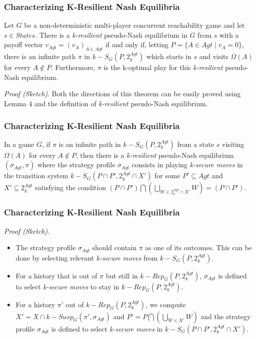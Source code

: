 \documentclass{beamer}
\begin{document}
\begin{frame}
\frametitle{Characterizing K-Resilient Nash Equilibria}
\begin{theorem}[5]
Let $G$ be a non-deterministic multi-player concurrent reachability game and let $s \in States$. There is a \textit{k-resilient} pseudo-Nash equilibrium in $G$ from $s$ with a payoff vector $v_{Agt} = (v_{A})_{A\in Agt}$ if and only if, letting $P = \lbrace A \in Agt \; \vert \; v_{A} = 0 \rbrace$, there is an infinite path $\pi$ in $k-S_{G}(P, 2^{Agt}_{k})$ which starts in $s$ and visits $\Omega(A)$ for every $A \notin P$. Furthermore, $\pi$ is the k-optimal play for this \textit{k-resilient} pseudo-Nash equilibrium.
\end{theorem}
\textit{Proof (Sketch)}. Both the directions of this theorem can be easily proved using Lemma 4 and the definition of \textit{k-resilient} pseudo-Nash equilibrium.
\end{frame}

\begin{frame}
\frametitle{Characterizing K-Resilient Nash Equilibria}
\begin{theorem}[6]
In a game $G$, if $\pi$ is an infinite path in $k-S_{G}(P, 2^{Agt}_{k})$ from a state $s$ visiting $\Omega(A)$ for every $A \notin P$, then there is a \textit{k-resilient} pseudo-Nash equilibrium $(\sigma_{Agt}, \pi)$ where the strategy profile $\sigma_{Agt}$ consists in playing \textit{k-secure moves} in the transition system $k-S_{G}(P \cap P', 2^{Agt}_{k} \cap X')$ for some $P' \subseteq Agt$ and $X' \subseteq 2^{Agt}_{k}$ satisfying the condition $(P \cap P') \bigcap \left( \bigcup \limits_{W \in 2^{Agt}_{k} \cap X'}W \right) = (P \cap P')$.
\end{theorem}
\end{frame}

\begin{frame}
\frametitle{Characterizing K-Resilient Nash Equilibria}
\textit{Proof (Sketch).}
\begin{itemize}
\item The strategy profile $\sigma_{Agt}$ should contain $\pi$ as one of its outcomes. This can be done by selecting relevant \textit{k-secure moves} from $k-S_{G}(P, 2^{Agt}_{k})$.
\item For a history that is out of $\pi$ but still in $k-Rep_{G}(P, 2^{Agt}_{k})$, $\sigma_{Agt}$ is defined to select \textit{k-secure moves} to stay in $k-Rep_{G}(P, 2^{Agt}_{k})$.
\item For a history $\pi'$ out of $k-Rep_{G}(P, 2^{Agt}_{k})$, we compute $X' = X \cap k-Susp_{G}(\pi', \sigma_{Agt})$ and $P' = P \bigcap \left( \bigcup \limits_{W \in X'}W \right)$ and the strategy profile $\sigma_{Agt}$ is defined to select \textit{k-secure moves} in $k-S_{G}(P \cap P', 2^{Agt}_{k} \cap X')$.
\end{itemize}
\end{frame}
\end{document}
